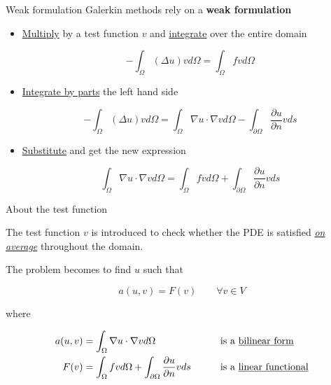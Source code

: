 \documentclass[10pt,externalviewer]{beamer}
\begin{document}
\begin{frame}{Weak formulation}
   Galerkin methods rely on a \textbf{\textcolor{BrickRed}{weak formulation}}

   \vspace{0.5cm}

   \pause

   \begin{itemize}
      \item \underline{Multiply} by a \textcolor{BrickRed}{test function} $v$ and \underline{integrate} over the entire domain
      
      \begin{equation*}
         -\int_\Omega(\Delta u)vd\Omega=\int_\Omega fvd\Omega
      \end{equation*}

      \pause

      \item \underline{Integrate by parts} the left hand side
      
      \begin{equation*}
         -\int_\Omega(\Delta u)vd\Omega=\int_\Omega\nabla u\cdot\nabla vd\Omega-\int_{\partial\Omega}\frac{\partial u}{\partial n}vds
      \end{equation*}

      \pause

      \item \underline{Substitute} and get the new expression
      
      \begin{equation*}
         \int_\Omega\nabla u\cdot\nabla vd\Omega=\int_\Omega fvd\Omega+\int_{\partial\Omega}\frac{\partial u}{\partial n}vds
      \end{equation*}
   \end{itemize}
\end{frame}

\begin{frame}{About the test function}
   \begin{center}
      \begin{framed}
         The test function $v$ is introduced to check whether the PDE is satisfied \textit{\underline{on average}} throughout the domain.
      \end{framed}
   \end{center}

   \pause

   The problem becomes to find $u$ such that

   \begin{equation*}
      a(u,v)=F(v) \qquad \forall v\in V
   \end{equation*}

   where

   \begin{alignat*}{2}
      a(u,v)&=\int_\Omega\nabla u\cdot\nabla vd\Omega \qquad &&\text{is a \underline{bilinear form}}\\
      F(v)&=\int_\Omega fvd\Omega+\int_{\partial\Omega}\frac{\partial u}{\partial n}vds \qquad &&\text{is a \underline{linear functional}}
   \end{alignat*}
\end{frame}
\end{document}
